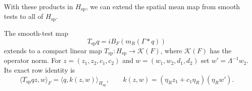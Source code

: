 With these products in $H_{\mathrm{sp}}$, we can extend the spatial mean map
from smooth tests to all of $H_{\mathrm{sp}}$.
%
\begin{proposition}\label{P:cameron-spatial-map}
  The smooth-test map
  \[
    T_{\mathrm{sp}}q=iB_F(m_R(\Gamma*q))
  \]
  extends to a compact linear map $T_{\mathrm{sp}}:H_{\mathrm{sp}} \to
  \mathcal{K}(F)$, where $\mathcal{K}(F)$ has the operator norm. For $z =
  (z_1,z_2,c_1,c_2)$ and $w = (w_1,w_2,d_1,d_2)$ set $w' = \Lambda^{-1}w_2$. Its
  exact row identity is
  \begin{equation}\label{E:cameron-spatial-row}
    \langle T_{\mathrm{sp}}qz,w\rangle_F
    =\langle q,k(z,w)\rangle_{H_{\mathrm{sp}}},
    \qquad
    k(z,w)=(\eta_Rz_1+c_1\eta_R)(\eta_Rw').
  \end{equation}
\end{proposition}


